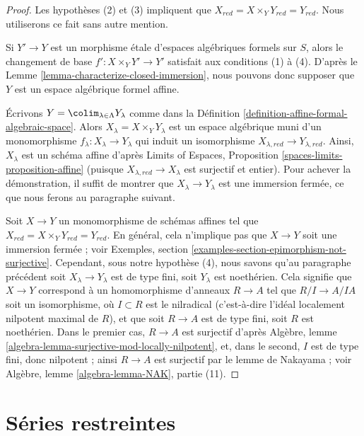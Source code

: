 \begin{proof}
Les hypothèses (2) et (3) impliquent que
$X_{red} = X \times_Y Y_{red} = Y_{red}$.
Nous utiliserons ce fait sans autre mention.

\medskip\noindent
Si $Y' \to Y$ est un morphisme étale d'espaces algébriques formels sur $S$,
alors le changement de base $f' : X \times_Y Y' \to Y'$ satisfait aux conditions
(1) à (4). D'après le Lemme \ref{lemma-characterize-closed-immersion},
nous pouvons donc supposer que $Y$ est un espace algébrique formel affine.

\medskip\noindent
Écrivons $Y = \colim_{\lambda \in \Lambda} Y_\lambda$ comme dans la
Définition \ref{definition-affine-formal-algebraic-space}.
Alors $X_\lambda = X \times_Y Y_\lambda$ est un espace algébrique
muni d'un monomorphisme $f_\lambda : X_\lambda \to Y_\lambda$
qui induit un isomorphisme $X_{\lambda, red} \to Y_{\lambda, red}$.
Ainsi, $X_\lambda$ est un schéma affine d'après
Limits of Espaces, Proposition \ref{spaces-limits-proposition-affine}
(puisque $X_{\lambda, red} \to X_\lambda$ est surjectif et entier).
Pour achever la démonstration, il suffit de montrer que
$X_\lambda \to Y_\lambda$ est une immersion fermée,
ce que nous ferons au paragraphe suivant.

\medskip\noindent
Soit $X \to Y$ un monomorphisme de schémas affines tel que
$X_{red} = X \times_Y Y_{red} = Y_{red}$. En général, cela
n'implique pas que $X \to Y$ soit une immersion fermée ; voir
Exemples, section \ref{examples-section-epimorphism-not-surjective}.
Cependant, sous notre hypothèse (4), nous savons qu'au paragraphe précédent
soit $X_\lambda \to Y_\lambda$ est de type fini, soit $Y_\lambda$
est noethérien. Cela signifie que
$X \to Y$ correspond à un homomorphisme d'anneaux $R \to A$ tel que
$R/I \to A/IA$ soit un isomorphisme, où $I \subset R$ est le
nilradical (c'est-à-dire l'idéal localement nilpotent maximal de $R$),
et que soit $R \to A$ est de type fini, soit $R$ est noethérien.
Dans le premier cas, $R \to A$ est surjectif d'après
Algèbre, lemme \ref{algebra-lemma-surjective-mod-locally-nilpotent},
et, dans le second, $I$ est de type fini, donc
nilpotent ; ainsi $R \to A$ est surjectif par le lemme de Nakayama ; voir
Algèbre, lemme \ref{algebra-lemma-NAK}, partie (11).
\end{proof}








\section{Séries restreintes}
\label{section-restricted-power-series}

